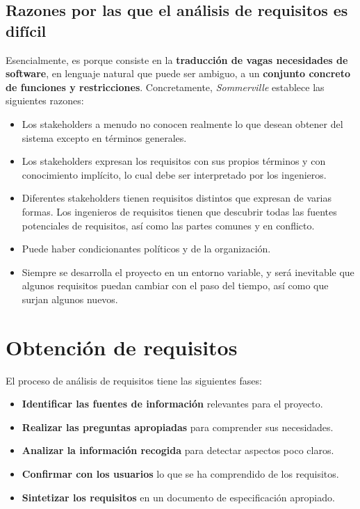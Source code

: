 \subsection{Razones por las que el análisis de requisitos es difícil}

Esencialmente, es porque consiste en la \textbf{traducción de vagas necesidades de software}, en lenguaje natural que puede ser ambiguo, a un \textbf{conjunto concreto de funciones y restricciones}. Concretamente, \textit{Sommerville} establece las siguientes razones:

\begin{itemize}
    \item Los stakeholders a menudo no conocen realmente lo que desean obtener del sistema excepto en términos generales.
    \item Los stakeholders expresan los requisitos con sus propios términos y con conocimiento implícito, lo cual debe ser interpretado por los ingenieros.
    \item Diferentes stakeholders tienen requisitos distintos que expresan de varias formas. Los ingenieros de requisitos tienen que descubrir todas las fuentes potenciales de requisitos, así como las partes comunes y en conflicto.
    \item Puede haber condicionantes políticos y de la organización.
    \item Siempre se desarrolla el proyecto en un entorno variable, y será inevitable que algunos requisitos puedan cambiar con el paso del tiempo, así como que surjan algunos nuevos.
\end{itemize}

\section{Obtención de requisitos}

El proceso de análisis de requisitos tiene las siguientes fases:

\begin{itemize}
    \item \textbf{Identificar las fuentes de información} relevantes para el proyecto.
    \item \textbf{Realizar las preguntas apropiadas} para comprender sus necesidades.
    \item \textbf{Analizar la información recogida} para detectar aspectos poco claros.
    \item \textbf{Confirmar con los usuarios} lo que se ha comprendido de los requisitos.
    \item \textbf{Sintetizar los requisitos} en un documento de especificación apropiado.
\end{itemize}

